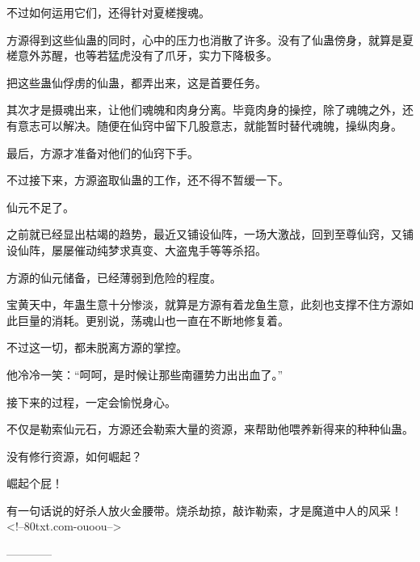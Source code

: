 \begin{this_body}
不过如何运用它们，还得针对夏槎搜魂。

方源得到这些仙蛊的同时，心中的压力也消散了许多。没有了仙蛊傍身，就算是夏槎意外苏醒，也等若猛虎没有了爪牙，实力下降极多。

把这些蛊仙俘虏的仙蛊，都弄出来，这是首要任务。

其次才是摄魂出来，让他们魂魄和肉身分离。毕竟肉身的操控，除了魂魄之外，还有意志可以解决。随便在仙窍中留下几股意志，就能暂时替代魂魄，操纵肉身。

最后，方源才准备对他们的仙窍下手。

不过接下来，方源盗取仙蛊的工作，还不得不暂缓一下。

仙元不足了。

之前就已经显出枯竭的趋势，最近又铺设仙阵，一场大激战，回到至尊仙窍，又铺设仙阵，屡屡催动纯梦求真变、大盗鬼手等等杀招。

方源的仙元储备，已经薄弱到危险的程度。

宝黄天中，年蛊生意十分惨淡，就算是方源有着龙鱼生意，此刻也支撑不住方源如此巨量的消耗。更别说，荡魂山也一直在不断地修复着。

不过这一切，都未脱离方源的掌控。

他冷冷一笑：“呵呵，是时候让那些南疆势力出出血了。”

接下来的过程，一定会愉悦身心。

不仅是勒索仙元石，方源还会勒索大量的资源，来帮助他喂养新得来的种种仙蛊。

没有修行资源，如何崛起？

崛起个屁！

有一句话说的好杀人放火金腰带。烧杀劫掠，敲诈勒索，才是魔道中人的风采！<!--80txt.com-ouoou-->

------------

\end{this_body}

